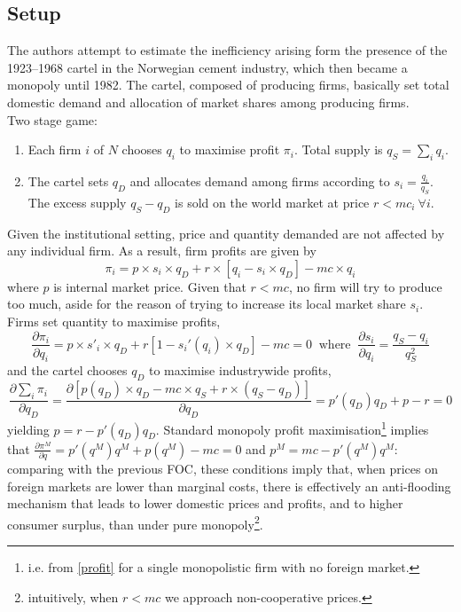 \documentclass[11pt]{article}
\numberwithin{equation}{section}
\begin{document}
\subsection{Setup}
The authors attempt to estimate the inefficiency arising form the presence of the 1923--1968 cartel in the Norwegian cement industry, which then became a monopoly until 1982. The cartel, composed of producing firms, basically set total domestic demand and allocation of market shares among producing firms. \\
Two stage game:
\begin{enumerate}
	\item Each firm $i$ of $N$ chooses $q_i$ to maximise profit $\pi_i$. Total supply is $q_S = \sum_{i}q_i$.
	\item The cartel sets $q_D$ and allocates demand among firms according to $s_i = \frac{q_i}{q_S}$. The excess supply $q_S - q_D$ is sold on the world market at price $ r < mc_i ~\forall i$.
\end{enumerate}

Given the institutional setting, price and quantity demanded are not affected by any individual firm. As a result, firm profits are given by
\begin{equation}
\label{profit}
	\pi_i = p \times s_i \times q_D + r \times [ q_i - s_i \times q_D ] - mc \times q_i
\end{equation}
where $p$ is internal market price. Given that $r < mc$, no firm will try to produce too much, aside for the reason of trying to increase its local market share $s_i$. Firms set quantity to maximise profits,
\begin{equation}
\label{firmmax}
	\frac{\partial \pi_i}{\partial q_i} = p \times s'_i \times q_D + r [1 - s_i'(q_i) \times q_D] - mc = 0 ~\text{ where }~ \frac{\partial s_i}{\partial q_i} = \frac{q_S - q_i}{q_S^2}
\end{equation}
and the cartel chooses $q_D$ to maximise industrywide profits,
\begin{equation}
\label{cartelq}
	\frac{\partial\sum_{i}\pi_i}{\partial q_D} = \frac{\partial [p(q_D) \times q_D - mc\times q_S + r\times (q_S - q_D)]}{\partial q_D} = p'(q_D)q_D + p - r = 0
\end{equation}
yielding $p = r - p'(q_D)q_D$. Standard monopoly profit maximisation\footnote{i.e. from \eqref{profit} for a single monopolistic firm with no foreign market.} implies that $\frac{\partial \pi^M}{\partial q} = p'(q^M)q^M + p(q^M) - mc = 0 $ and $p^M = mc - p'(q^M)q^M$: comparing with the previous FOC, these conditions imply that, when prices on foreign markets are lower than marginal costs, there is effectively an anti-flooding mechanism that leads to lower domestic prices and profits, and to higher consumer surplus, than under pure monopoly\footnote{intuitively, when $r < mc$ we approach non-cooperative prices.}. \\
\end{document}
